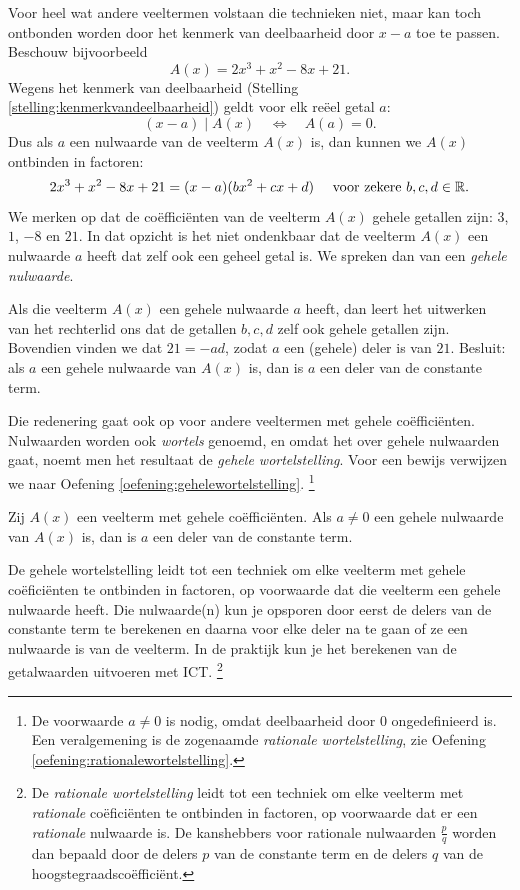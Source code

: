 \documentclass{ximera}
\begin{document}
Voor heel wat andere veeltermen volstaan die technieken niet, maar kan toch ontbonden worden door het kenmerk van deelbaarheid door $x-a$ toe te passen. Beschouw bijvoorbeeld
\[
A(x) = 2x^3 +x^2 - 8x + 21.
\]
Wegens het kenmerk van deelbaarheid (Stelling \ref{stelling:kenmerkvandeelbaarheid}) geldt voor elk re\"eel getal $a$: 
\[
(x-a) \mid A(x) \quad \Leftrightarrow \quad A(a) = 0. 
\]
Dus als $a$ een nulwaarde van de veelterm $A(x)$ is, dan kunnen we $A(x)$ ontbinden in factoren:
\[
2x^3 +x^2 - 8x + 21 = (x-a)(bx^2 + cx + d) %
\quad 
\text{ voor zekere } b,c,d \in \R.
\]
We merken op dat de co\"effici\"enten van de veelterm $A(x)$ gehele getallen zijn: $3$, $1$, $-8$ en $21$. In dat opzicht is het niet ondenkbaar dat de veelterm $A(x)$ een nulwaarde $a$ heeft dat zelf ook een geheel getal is. We spreken dan van een {\em gehele nulwaarde}.

Als die veelterm $A(x)$ een gehele nulwaarde $a$ heeft, dan leert het uitwerken van het rechterlid ons dat de getallen $b,c,d$ zelf ook gehele getallen zijn. Bovendien vinden we dat $21 = -ad$, zodat $a$ een (gehele) deler is van $21$. Besluit: als $a$ een gehele nulwaarde van $A(x)$ is, dan is $a$ een deler van de constante term. 

Die redenering gaat ook op voor andere veeltermen met gehele co\"effici\"enten. Nulwaarden worden ook {\em wortels} genoemd, en omdat het over gehele nulwaarden gaat, noemt men het resultaat de {\em gehele wortelstelling}. Voor een bewijs verwijzen we naar Oefening \ref{oefening:gehelewortelstelling}.
\footnote{De voorwaarde $a \neq 0$ is nodig, omdat deelbaarheid door $0$ ongedefinieerd is.
Een veralgemening is de zogenaamde {\em rationale wortelstelling}, zie Oefening \ref{oefening:rationalewortelstelling}.}

\begin{theorem} 
Zij $A(x)$ een veelterm met gehele co\"effici\"enten. Als $a \neq 0$ een gehele nulwaarde van $A(x)$ is, dan is $a$ een deler van de constante term. 
\end{theorem} 



De gehele wortelstelling leidt tot een techniek om elke veelterm met gehele co\"efici\"enten te ontbinden in factoren, op voorwaarde dat die veelterm een gehele nulwaarde heeft. Die nulwaarde(n) kun je opsporen door eerst de delers van de constante term te berekenen en daarna voor elke deler na te gaan of ze een nulwaarde is van de veelterm. In de praktijk kun je het berekenen van de getalwaarden uitvoeren met ICT. \footnote{De {\em rationale wortelstelling} leidt tot een techniek om elke veelterm met {\em rationale} co\"efici\"enten 
te ontbinden in factoren, op voorwaarde dat er een {\em rationale} nulwaarde is. De kanshebbers voor rationale nulwaarden $\frac{p}{q}$ worden dan bepaald door de delers $p$ van de constante term en de delers $q$ van de hoogstegraadsco\"effici\"ent.}
\end{document}
